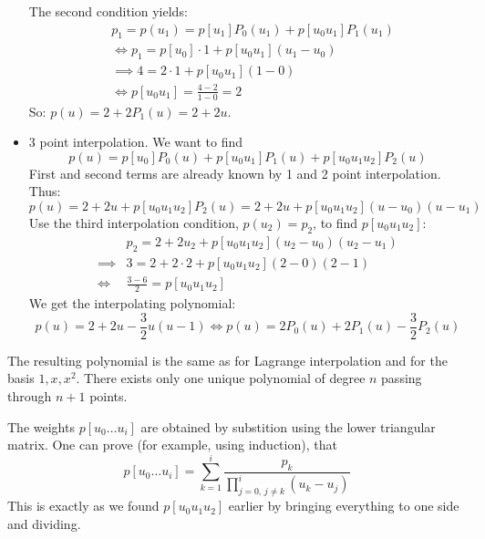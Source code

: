 \begin{example}
\begin{itemize}
{            The second condition yields:
            \begin{align*}
                &p_1 = p(u_1) = p[u_1] P_0(u_1) + p[u_0 u_1] P_1(u_1)\\
                &\iff p_1 = p[u_0] \cdot 1 + p[u_0 u_1] (u_1 - u_0)\\
                &\implies 4 = 2 \cdot 1 + p[u_0 u_1] (1 - 0)\\
                &\iff p[u_0 u_1] = \frac{4 - 2}{1 - 0} = 2
            \end{align*}
            So: $p(u) = 2 + 2 P_1(u) = 2 + 2u$.
        }
        \item {
            3 point interpolation. We want to find
            \[
                p(u) = p[u_0] P_0(u) + p[u_0 u_1] P_1(u) +
                p[u_0 u_1 u_2] P_2(u)
            \]
            First and second terms are already known by 1 and 2 point interpolation.
            Thus:
            \[ 
                p(u) = 2 + 2u + p[u_0 u_1 u_2] P_2(u) =
                2 + 2u + p[u_0 u_1 u_2] (u - u_0)(u - u_1)
            \]
            Use the third interpolation condition, $p(u_2) = p_2$, to find $p[u_0 u_1 u_2]$:
            \begin{align*}
                & p_2 = 2 + 2u_2 + p[u_0 u_1 u_2](u_2 - u_0)(u_2 - u_1)\\
                \implies & 3 = 2 + 2 \cdot 2 + p[u_0 u_1 u_2] (2 - 0)(2 - 1)\\
                \iff & \frac{3 - 6}{2} = p[u_0 u_1 u_2]
            \end{align*}
            We get the interpolating polynomial:
            \[
                p(u) = 2 + 2u - \frac{3}{2} u(u - 1) \iff
                p(u) = 2P_0(u) + 2P_1(u) - \frac{3}{2} P_2(u)
            \]
        }
    \end{itemize}
\end{example}
\begin{remark}
    The resulting polynomial is the same as for Lagrange interpolation
    and for the basis $1, x, x^2$.
    There exists only one unique polynomial of degree $n$ passing through
    $n + 1$ points.
\end{remark}

The weights $p[u_0 \dots u_i]$ are obtained by substition using 
the lower triangular matrix. One can prove (for example, using induction), that
\[
    p[u_0 \dots u_i] = \sum_{k=1}^i
    \frac{p_k}{
        \prod_{j = 0,\, j \ne k}^{i} (u_k - u_j)
    }
\]
This is exactly as we found $p[u_0 u_1 u_2]$ earlier by bringing everything to one side
and dividing.

